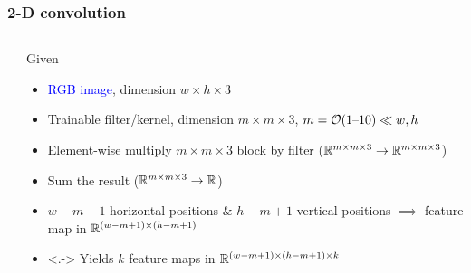 \begin{frame}
    \frametitle{2-D convolution}
    \begin{columns}
        \begin{column}{0.41\textwidth}
            
        \end{column}
        \begin{column}{0.59\textwidth}
            Given
            \begin{itemize}[<+->]
                \item \textcolor{blue}{RGB image}, dimension $w \times h \times 3$
                \item Trainable \alert{filter}/\alert{kernel}, dimension $m \times m \times 3$, $m = \mathcal{O}(1 \text{--} 10) \ll w, h$
            \end{itemize}
            \begin{itemize}[<.->]
                \item Element-wise multiply $m \times m \times 3$ block by filter ($\mathbb{R}^{m \times m \times 3} \to \mathbb{R}^{m \times m \times 3}$)
                \item Sum the result ($\mathbb{R}^{m \times m \times 3} \to \mathbb{R}$)
                \setcounter{beamerpauses}{9}
                \item<+-> $w - m + 1$ horizontal positions \& $h - m + 1$ vertical positions $\implies$ \textcolor{Green4}{feature map} in $\mathbb{R}^{(w-m+1) \times (h-m+1)}$
            \end{itemize}

            \begin{itemize}
                \item<.-> Yields $k$ feature maps in $\mathbb{R}^{(w-m+1) \times (h-m+1) \times k}$
            \end{itemize}

        \end{column}
    \end{columns}
\end{frame}

